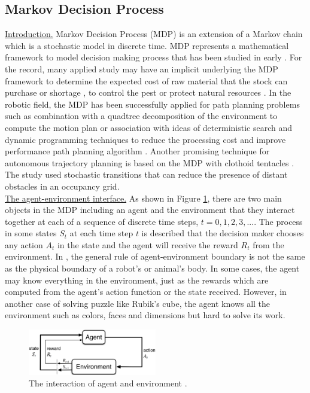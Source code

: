 \subsection{Markov Decision Process}
\noindent\uline{Introduction.} 
Markov Decision Process (MDP) is an extension of a Markov chain which is a stochastic model in discrete time. MDP represents a mathematical framework to model decision making process that has been studied in early \cite{Howard60_DP_MDP, Miller68_MDP}. For the record, many applied study may have an implicit underlying the MDP framework to determine the expected cost of raw material that the stock can purchase or shortage \cite{White85_ApplicationMDP}, to control the pest or protect natural resources \cite{White93_ApplicationMDP}. In the robotic field, the MDP has been successfully applied for path planning problems such as combination with a quadtree decomposition of the environment to compute the motion plan \cite{Burlet04_MP_MDP} or association with ideas of deterministic search and dynamic programming techniques to reduce the processing cost and improve performance path planning algorithm \cite{Ferguson04_MDP_Pathplanning}. Another promising technique for autonomous trajectory planning is based on the MDP with clothoid tentacles \cite{Muhager16_MDP_Clothes}. The study used stochastic transitions \cite{Puterman14_Book_MDP_DiscreteDP} that can reduce the presence of distant obstacles in an occupancy grid.\\


\noindent\uline{The agent-environment interface.} 
As shown in Figure \ref{fig:MDP1}, there are two main objects in the MDP including an agent and the environment that they interact together at each of a sequence of discrete time steps, $t=0,1,2,3,...$. The process in some states $S_t$ at each time step $t$ is described that the decision maker chooses any action $A_t$ in the state and the agent will receive the reward $R_t$ from the environment. In \cite{SuttonBarto18_RLbook}, the general rule of agent-environment boundary is not the same as the physical boundary of a robot's or animal's body. In some cases, the agent may know everything in the environment, just as the rewards which are computed from the agent's action function or the state received. However, in another case of solving puzzle like Rubik's cube, the agent knows all the environment such as colors, faces and dimensions but hard to solve its work.
\begin{figure}[h]
	\begin{center}
	\includegraphics[width=0.5\textwidth]{image/SuttonBartoI_RL.png}
	\end{center}
	\caption{The interaction of agent and environment \cite{SuttonBarto18_RLbook}.}
	\label{fig:MDP1}
\end{figure}


